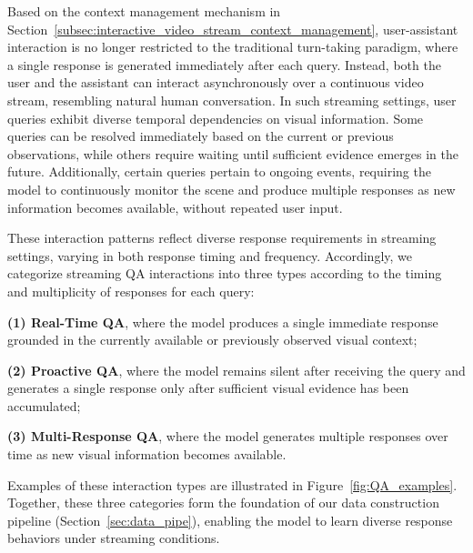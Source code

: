 Based on the context management mechanism in Section~\ref{subsec:interactive_video_stream_context_management}, user-assistant interaction is no longer restricted to the traditional turn-taking paradigm, where a single response is generated immediately after each query. Instead, both the user and the assistant can interact asynchronously over a continuous video stream, resembling natural human conversation.
In such streaming settings, user queries exhibit diverse temporal dependencies on visual information. Some queries can be resolved immediately based on the current or previous observations, while others require waiting until sufficient evidence emerges in the future. Additionally, certain queries pertain to ongoing events, requiring the model to continuously monitor the scene and produce multiple responses as new information becomes available, without repeated user input.

These interaction patterns reflect diverse response requirements in streaming settings, varying in both response timing and frequency. Accordingly, we categorize streaming QA interactions into three types according to the timing and multiplicity of responses for each query:

\textbf{(1) Real-Time QA}, where the model produces a single immediate response grounded in the currently available or previously observed visual context;

\textbf{(2) Proactive QA}, where the model remains silent after receiving the query and generates a single response only after sufficient visual evidence has been accumulated;

\textbf{(3) Multi-Response QA}, where the model generates multiple responses over time as new visual information becomes available.

Examples of these interaction types are illustrated in Figure~\ref{fig:QA_examples}. Together, these three categories form the foundation of our data construction pipeline (Section~\ref{sec:data_pipe}), enabling the model to learn diverse response behaviors under streaming conditions.








